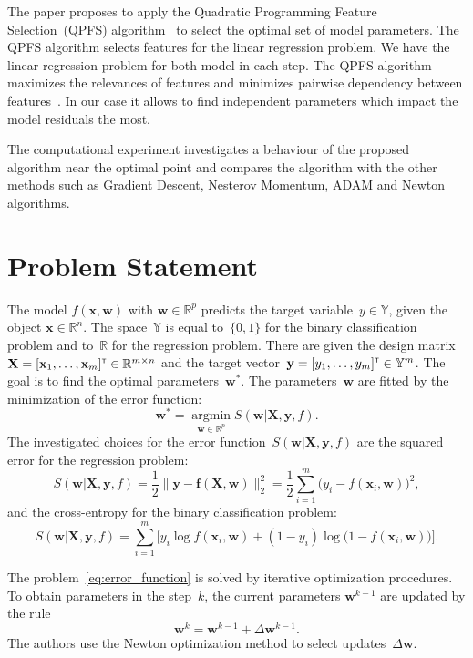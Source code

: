 \documentclass[
11pt,%
tightenlines,%
twoside,%
onecolumn,%
nofloats,%
nobibnotes,%
nofootinbib,%
superscriptaddress,%
noshowpacs,%
centertags]%
{revtex4}
\newcommand{\bw}{\mathbf{w}}
\newcommand{\by}{\mathbf{y}}
\newcommand{\bx}{\mathbf{x}}
\newcommand{\bbR}{\mathbb{R}}
\newcommand{\bbY}{\mathbb{Y}}
\newcommand{\bX}{\mathbf{X}}
\newcommand{\T}{{\text{\tiny\sffamily\upshape\mdseries T}}}
\newcommand{\argmin}{\mathop{\arg \min}\limits}
\begin{document}
The paper proposes to apply the Quadratic Programming Feature Selection~(QPFS) algorithm~\cite{katrutsa2017comprehensive,rodriguez2010qpfs} to select the optimal set of model parameters. The QPFS algorithm selects features for the linear regression problem. We have the linear regression problem for both model in each step. The QPFS algorithm maximizes the relevances of features and minimizes pairwise dependency between features~\cite{ding2005mrmr}. In our case it allows to find independent parameters which impact the model residuals the most.

The computational experiment investigates a behaviour of the proposed algorithm near the optimal point and compares the algorithm with the other methods such as Gradient Descent, Nesterov Momentum, ADAM and Newton algorithms. 

\section{Problem Statement}
The model $f( \bx, \bw)$ with $\bw \in \mathbb{R}^p$ predicts the target variable~$y \in \bbY$, given the object $\bx \in \bbR^{n}$. The space~$\bbY$ is equal to~$\{0, 1\}$ for the binary classification problem and to~$\bbR$ for the regression problem.
There are given the design matrix~$\bX = [\bx_1, \dots, \bx_m]^{\T} \in \bbR^{m \times n}$ and the target vector~$\by = [y_1, \dots, y_m]^{\T} \in \bbY^{m}$. 
The goal is to find the optimal parameters~$\bw^*$.
The parameters~$\bw$ are fitted by the minimization of the error function:
\begin{equation}
\bw^* = \argmin_{\bw \in \bbR^p} S(\bw | \bX, \by, f).
\label{eq:error_function}
\end{equation}
The investigated choices for the error function~$S(\bw | \bX, \by, f)$ are
the squared error for the regression problem: 
\begin{equation}
S(\bw | \bX, \by, f) = \frac 12 \| \by - \mathbf{f}(\bX, \bw) \|_2^2 = \frac 12 \sum_{i=1}^m \bigl( y_i - f(\bx_i,  \bw)\bigr)^2,
\label{eq:squared_error}
\end{equation}
and the cross-entropy for the binary classification problem: 
\begin{equation}
S(\bw | \bX, \by, f) = \sum_{i=1}^m \bigl[y_i \log f (\bx_i , \bw) + (1-y_i) \log \bigl(1 - f (\bx_i , \bw)\bigr)\bigr].
\label{eq:log_loss}
\end{equation}

The problem~\eqref{eq:error_function} is solved by iterative optimization procedures. 
To obtain parameters in the step~$k$, the current parameters $\bw^{k-1}$ are updated by the rule
\begin{equation}
\bw^k = \bw^{k - 1} + \Delta \bw^{k - 1}.
\label{eq:update_rule}
\end{equation}
The authors use the Newton optimization method to select  updates~$\Delta \bw$.
\end{document}
